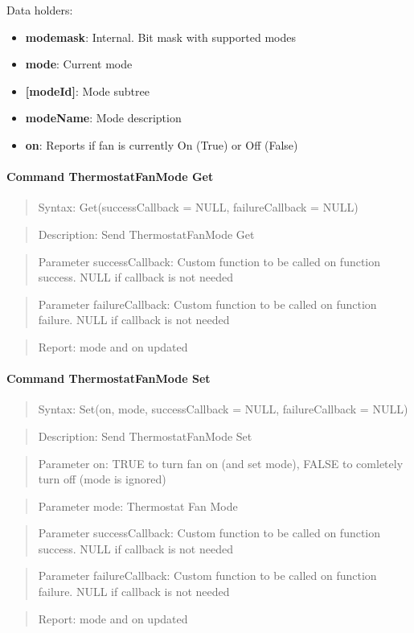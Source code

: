 \noindent
Data holders:

\begin{itemize}
\item \textbf{modemask}: Internal. Bit mask with supported modes
\item \textbf{mode}: Current mode
\item \textbf{[modeId]}: Mode subtree
\item \qquad\textbf{modeName}: Mode description
\item \textbf{on}: Reports if fan is currently On (True) or Off (False)
\end{itemize}

\paragraph{Command ThermostatFanMode Get}
\begin{quote}Syntax: Get(successCallback = NULL, failureCallback = NULL)\end{quote}
\begin{quote}Description: Send ThermostatFanMode Get\end{quote}
\begin{quote}Parameter successCallback: Custom function to be called on function success. NULL if callback is not needed\end{quote}
\begin{quote}Parameter failureCallback: Custom function to be called on function failure. NULL if callback is not needed\end{quote}
\begin{quote}Report: mode and on updated\end{quote}

\paragraph{Command ThermostatFanMode Set}
\begin{quote}Syntax: Set(on, mode, successCallback = NULL, failureCallback = NULL)\end{quote}
\begin{quote}Description: Send ThermostatFanMode Set\end{quote}
\begin{quote}Parameter on: TRUE to turn fan on (and set mode), FALSE to comletely turn off (mode is ignored)\end{quote}
\begin{quote}Parameter mode: Thermostat Fan Mode\end{quote}
\begin{quote}Parameter successCallback: Custom function to be called on function success. NULL if callback is not needed\end{quote}
\begin{quote}Parameter failureCallback: Custom function to be called on function failure. NULL if callback is not needed\end{quote}
\begin{quote}Report: mode and on updated\end{quote}


